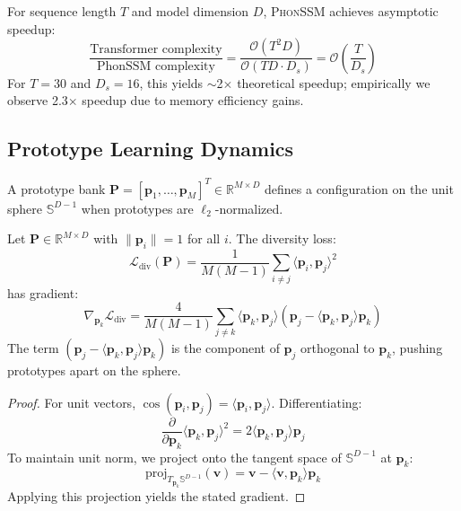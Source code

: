 \documentclass{article}
\newcommand{\phonssm}{\textsc{PhonSSM}}
\begin{document}
\begin{corollary}
For sequence length $T$ and model dimension $D$, \phonssm{} achieves asymptotic speedup:
\begin{equation}
\frac{\text{Transformer complexity}}{\text{PhonSSM complexity}} = \frac{\mathcal{O}(T^2 D)}{\mathcal{O}(TD \cdot D_s)} = \mathcal{O}\left(\frac{T}{D_s}\right)
\end{equation}
For $T=30$ and $D_s=16$, this yields $\sim$2$\times$ theoretical speedup; empirically we observe 2.3$\times$ speedup due to memory efficiency gains.
\end{corollary}

\subsection{Prototype Learning Dynamics}

\begin{definition}
A prototype bank $\mathbf{P} = [\mathbf{p}_1, \ldots, \mathbf{p}_M]^T \in \mathbb{R}^{M \times D}$ defines a configuration on the unit sphere $\mathbb{S}^{D-1}$ when prototypes are $\ell_2$-normalized.
\end{definition}

\begin{theorem}
\label{thm:diversity}
Let $\mathbf{P} \in \mathbb{R}^{M \times D}$ with $\|\mathbf{p}_i\| = 1$ for all $i$. The diversity loss:
\begin{equation}
\mathcal{L}_{\text{div}}(\mathbf{P}) = \frac{1}{M(M-1)} \sum_{i \neq j} \langle \mathbf{p}_i, \mathbf{p}_j \rangle^2
\end{equation}
has gradient:
\begin{equation}
\nabla_{\mathbf{p}_k} \mathcal{L}_{\text{div}} = \frac{4}{M(M-1)} \sum_{j \neq k} \langle \mathbf{p}_k, \mathbf{p}_j \rangle \left( \mathbf{p}_j - \langle \mathbf{p}_k, \mathbf{p}_j \rangle \mathbf{p}_k \right)
\end{equation}
The term $(\mathbf{p}_j - \langle \mathbf{p}_k, \mathbf{p}_j \rangle \mathbf{p}_k)$ is the component of $\mathbf{p}_j$ orthogonal to $\mathbf{p}_k$, pushing prototypes apart on the sphere.
\end{theorem}

\begin{proof}
For unit vectors, $\cos(\mathbf{p}_i, \mathbf{p}_j) = \langle \mathbf{p}_i, \mathbf{p}_j \rangle$. Differentiating:
\begin{equation}
\frac{\partial}{\partial \mathbf{p}_k} \langle \mathbf{p}_k, \mathbf{p}_j \rangle^2 = 2 \langle \mathbf{p}_k, \mathbf{p}_j \rangle \mathbf{p}_j
\end{equation}
To maintain unit norm, we project onto the tangent space of $\mathbb{S}^{D-1}$ at $\mathbf{p}_k$:
\begin{equation}
\text{proj}_{T_{\mathbf{p}_k}\mathbb{S}^{D-1}}(\mathbf{v}) = \mathbf{v} - \langle \mathbf{v}, \mathbf{p}_k \rangle \mathbf{p}_k
\end{equation}
Applying this projection yields the stated gradient.
\end{proof}
\end{document}
